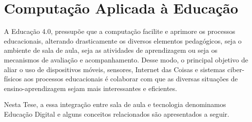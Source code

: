 
\section{Computação Aplicada à Educação}\label{section:computacao_educacao}

A Educação 4.0, pressupõe que a computação facilite e aprimore os processos educacionais, alterando drasticamente os diversos elementos pedagógicos, seja o ambiente de sala de aula, seja as atividades de aprendizagem ou seja os mecanismos de avaliação e acompanhamento. Desse modo, o principal objetivo de aliar o uso de dispositivos móveis, sensores, Internet das Coisas e sistemas ciber-físicos aos processos educacionais é colaborar com que as diversas situações de  ensino-aprendizagem sejam mais interessantes e eficientes.

Nesta Tese, a essa integração entre sala de aula e tecnologia denominamos Educação Digital e alguns conceitos relacionados são apresentados a seguir.

